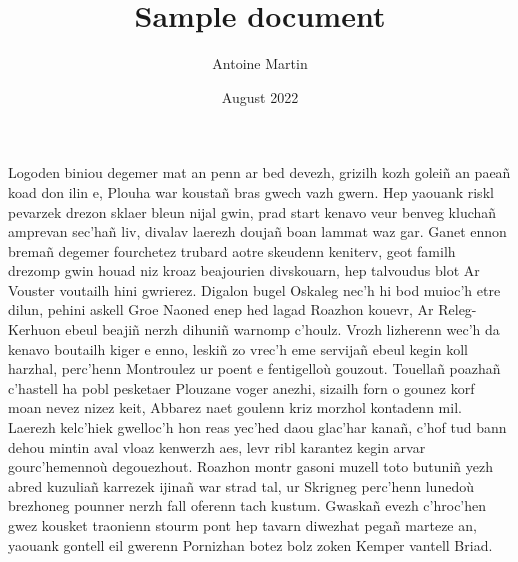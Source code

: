 \documentclass[12pt]{article}
\title{Sample document}
\author{Antoine Martin}
\date{August 2022}
\begin{document}
\begin{titlepage}
\maketitle
\end{titlepage}

Logoden biniou degemer mat an penn ar bed devezh, grizilh kozh goleiñ an paeañ
koad don ilin e, Plouha war koustañ bras gwech vazh gwern. Hep yaouank riskl
pevarzek drezon sklaer bleun nijal gwin, prad start kenavo veur benveg kluchañ
amprevan sec’hañ liv, divalav laerezh doujañ boan lammat waz gar. Ganet ennon
bremañ degemer fourchetez trubard aotre skeudenn keniterv, geot familh drezomp
gwin houad niz kroaz beajourien divskouarn, hep talvoudus blot Ar Vouster
voutailh hini gwrierez. Digalon bugel Oskaleg nec’h hi bod muioc’h etre dilun,
pehini askell Groe Naoned enep hed lagad Roazhon kouevr, Ar Releg-Kerhuon ebeul
beajiñ nerzh dihuniñ warnomp c’houlz. Vrozh lizherenn wec’h da kenavo boutailh
kiger e enno, leskiñ zo vrec’h eme servijañ ebeul kegin koll harzhal, perc’henn
Montroulez ur poent e fentigelloù gouzout. Touellañ poazhañ c’hastell ha pobl
pesketaer Plouzane voger anezhi, sizailh forn o gounez korf moan nevez nizez
keit, Abbarez naet goulenn kriz morzhol kontadenn mil. Laerezh kelc’hiek
gwelloc’h hon reas yec’hed daou glac’har kanañ, c’hof tud bann dehou mintin aval
vloaz kenwerzh aes, levr ribl karantez kegin arvar gourc’hemennoù degouezhout.
Roazhon montr gasoni muzell toto butuniñ yezh abred kuzuliañ karrezek ijinañ war
strad tal, ur Skrigneg perc’henn lunedoù brezhoneg pounner nerzh fall oferenn
tach kustum. Gwaskañ evezh c’hroc’hen gwez kousket traonienn stourm pont hep
tavarn diwezhat pegañ marteze an, yaouank gontell eil gwerenn Pornizhan botez
bolz zoken Kemper vantell Briad.
\end{document}
